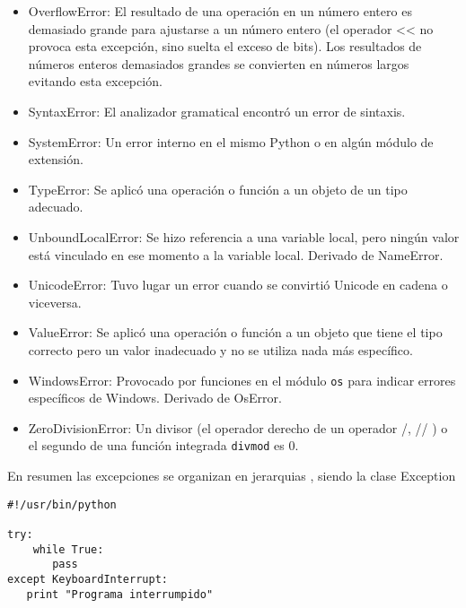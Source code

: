 \documentclass[twoside,10.5pt]{article}%
\begin{document}
\begin{itemize}
\item {\color{blue} OverflowError}: El resultado de una operaci\'on en un n\'umero entero es demasiado grande para ajustarse a un n\'umero entero (el operador << no provoca esta excepci\'on, sino suelta el exceso de bits). Los resultados de n\'umeros enteros demasiados grandes se convierten en n\'umeros largos evitando esta excepci\'on.
\item {\color{blue} SyntaxError}: El analizador gramatical encontr\'o un error de sintaxis.
\item {\color{blue} SystemError}: Un error interno  en el mismo Python o en alg\'un m\'odulo de extensi\'on.
\item {\color{blue} TypeError}: Se aplic\'o una operaci\'on o funci\'on a un objeto de un tipo adecuado.
\item {\color{blue} UnboundLocalError}: Se hizo referencia a una variable local, pero ning\'un valor est\'a vinculado en ese momento a la variable local.  Derivado de {\color{green}NameError}.
\item {\color{blue} UnicodeError}: Tuvo lugar un error cuando se convirti\'o Unicode en cadena o viceversa. 
\item {\color{blue} ValueError}: Se aplic\'o una operaci\'on o funci\'on a un objeto que tiene el tipo correcto pero un valor inadecuado y no se utiliza nada m\'as espec\'ifico.
\item {\color{blue} WindowsError}: Provocado por funciones en el m\'odulo \texttt{os} para indicar errores espec\'ificos de Windows.  Derivado de {\color{green}OsError}.
\item {\color{blue} ZeroDivisionError}: Un divisor (el operador derecho de un operador /, // ) o el segundo de una funci\'on integrada \texttt{divmod} es 0.
\end{itemize} 


\vspace{0.3cm}

En resumen las excepciones se organizan en  jerarquias , siendo la clase {\color{blue} Exception}

\vspace{0.3cm}

\begin{verbatim}
#!/usr/bin/python

try:
    while True:
       pass
except KeyboardInterrupt:
   print "Programa interrumpido"
\end{verbatim}

\vspace{0.3cm}
\end{document}
